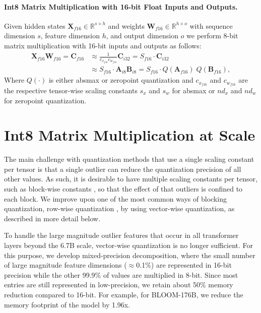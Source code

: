 \documentclass{article}
\begin{document}
\paragraph{Int8 Matrix Multiplication with 16-bit Float Inputs and Outputs.}

Given hidden states ${\mathbf{X}_{f16}\in \mathbb{R}^{s\times h}}$ and weights $\mathbf{W}_{f16}\in \mathbb{R}^{h\times o}$ with sequence dimension $s$, feature dimension $h$, and output dimension $o$ we perform 8-bit matrix multiplication with 16-bit inputs and outputs as follows:
\begin{equation}
\begin{split}
    \mathbf{X}_{f16} \mathbf{W}_{f16} =\mathbf{C}_{f16}  & \approx \frac{1}{c_{x_{f16}}c_{w_{f16}}} \mathbf{C}_{i32} = S_{f16}\cdot\mathbf{C}_{i32}\\
    & \approx S_{f16}\cdot\mathbf{A}_{i8}\mathbf{B}_{i8} = S_{f16}\cdot Q(\mathbf{A}_{f16})\phantom{.} Q(\mathbf{B}_{f16}),
\end{split}
\end{equation}
Where $Q(\cdot)$ is either absmax or zeropoint quantization and $c_{x_{f16}}$ and $c_{w_{f16}}$ are the respective tensor-wise scaling constants $s_x$ and $s_w$ for absmax or $nd_x$ and $nd_w$ for zeropoint quantization.


\section{Int8 Matrix Multiplication at Scale}
\label{sec:matmulatscale}

The main challenge with quantization methods that use a single scaling constant per tensor is that a single outlier can reduce the quantization precision of all other values. As such, it is desirable to have multiple scaling constants per tensor, such as block-wise constants \citep{dettmers2022optimizers}, so that the effect of that outliers is confined to each block. We improve upon one of the most common ways of blocking quantization, row-wise quantization \citep{fbgemm}, by using vector-wise quantization, as described in more detail below.

To handle the large magnitude outlier features that occur in all transformer layers beyond the 6.7B scale, vector-wise quantization is no longer sufficient. For this purpose, we develop mixed-precision decomposition, where the small number of large magnitude feature dimensions ($\approx$0.1\%) are represented in 16-bit precision while the other 99.9\% of values are multiplied in 8-bit. Since most entries are still represented in low-precision, we retain about 50\% memory reduction compared to 16-bit. For example, for BLOOM-176B, we reduce the memory footprint of the model by 1.96x.
\end{document}
